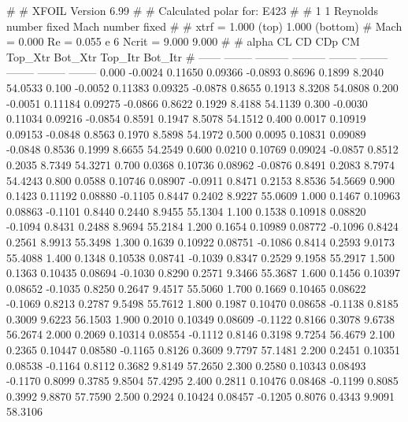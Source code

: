 #  
#       XFOIL         Version 6.99
#  
# Calculated polar for: E423                                            
#  
# 1 1 Reynolds number fixed          Mach number fixed         
#  
# xtrf =   1.000 (top)        1.000 (bottom)  
# Mach =   0.000     Re =     0.055 e 6     Ncrit =   9.000  9.000
#  
#   alpha    CL        CD       CDp       CM     Top_Xtr  Bot_Xtr  Top_Itr  Bot_Itr
#  ------ -------- --------- --------- -------- -------- -------- -------- --------
   0.000  -0.0024   0.11650   0.09366  -0.0893   0.8696   0.1899   8.2040  54.0533
   0.100  -0.0052   0.11383   0.09325  -0.0878   0.8655   0.1913   8.3208  54.0808
   0.200  -0.0051   0.11184   0.09275  -0.0866   0.8622   0.1929   8.4188  54.1139
   0.300  -0.0030   0.11034   0.09216  -0.0854   0.8591   0.1947   8.5078  54.1512
   0.400   0.0017   0.10919   0.09153  -0.0848   0.8563   0.1970   8.5898  54.1972
   0.500   0.0095   0.10831   0.09089  -0.0848   0.8536   0.1999   8.6655  54.2549
   0.600   0.0210   0.10769   0.09024  -0.0857   0.8512   0.2035   8.7349  54.3271
   0.700   0.0368   0.10736   0.08962  -0.0876   0.8491   0.2083   8.7974  54.4243
   0.800   0.0588   0.10746   0.08907  -0.0911   0.8471   0.2153   8.8536  54.5669
   0.900   0.1423   0.11192   0.08880  -0.1105   0.8447   0.2402   8.9227  55.0609
   1.000   0.1467   0.10963   0.08863  -0.1101   0.8440   0.2440   8.9455  55.1304
   1.100   0.1538   0.10918   0.08820  -0.1094   0.8431   0.2488   8.9694  55.2184
   1.200   0.1654   0.10989   0.08772  -0.1096   0.8424   0.2561   8.9913  55.3498
   1.300   0.1639   0.10922   0.08751  -0.1086   0.8414   0.2593   9.0173  55.4088
   1.400   0.1348   0.10538   0.08741  -0.1039   0.8347   0.2529   9.1958  55.2917
   1.500   0.1363   0.10435   0.08694  -0.1030   0.8290   0.2571   9.3466  55.3687
   1.600   0.1456   0.10397   0.08652  -0.1035   0.8250   0.2647   9.4517  55.5060
   1.700   0.1669   0.10465   0.08622  -0.1069   0.8213   0.2787   9.5498  55.7612
   1.800   0.1987   0.10470   0.08658  -0.1138   0.8185   0.3009   9.6223  56.1503
   1.900   0.2010   0.10349   0.08609  -0.1122   0.8166   0.3078   9.6738  56.2674
   2.000   0.2069   0.10314   0.08554  -0.1112   0.8146   0.3198   9.7254  56.4679
   2.100   0.2365   0.10447   0.08580  -0.1165   0.8126   0.3609   9.7797  57.1481
   2.200   0.2451   0.10351   0.08538  -0.1164   0.8112   0.3682   9.8149  57.2650
   2.300   0.2580   0.10343   0.08493  -0.1170   0.8099   0.3785   9.8504  57.4295
   2.400   0.2811   0.10476   0.08468  -0.1199   0.8085   0.3992   9.8870  57.7590
   2.500   0.2924   0.10424   0.08457  -0.1205   0.8076   0.4343   9.9091  58.3106
